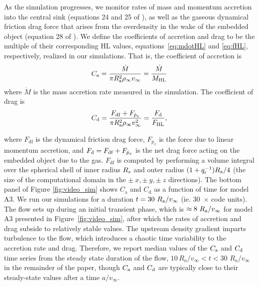 As the simulation progresses, we monitor rates of mass and momentum accretion into the central sink (equations 24 and 25 of \cite{MacLeod:2017}), as well as the gaseous dynamical friction drag force that arises from the overdensity in the wake of the embedded object (equation 28 of \cite{MacLeod:2017}). 
We define the coefficients of accretion and drag to be the multiple of their corresponding HL %
values, equations~\eqref{eq:mdotHL} and \eqref{eq:fHL}, respectively, realized in our simulations.  That is, the coefficient of accretion is
\begin{equation}\label{eq:C_a}
    C_{\mathrm a} = \frac{\dot M}{\pi R_{\mathrm{a}}^2 \rho_\infty v_\infty} = \frac{\dot M }{ M_{\rm{HL}}}
\end{equation}
where $\dot M$ is the mass accretion rate measured in the simulation. The coefficient of drag is 
\begin{equation}\label{eq:C_d}
    C_{\mathrm d} = \frac{F_{\mathrm{df}} + F_{\dot p_x} }{ \pi R_{\mathrm{a}}^2 \rho_\infty v_\infty^2} = \frac{F_{\rm d} }{ F_{\rm{HL}}},
\end{equation}

where $F_{\mathrm{df}}$ is the dynamical friction drag force, $F_{\dot p_x}$ is the force due to linear momentum accretion, and $F_{\rm d} = F_{\mathrm{df}} + F_{\dot p_x}$ is the net drag force acting on the embedded object due to the gas. $F_{\mathrm{df}}$ is computed by performing a volume integral over the spherical shell of inner radius $R_{\rm s}$ and outer radius $(1 + q_{\rm r}^{-1}) R_{\mathrm{a}}/4$ (the size of the computational domain in the $\pm~x, \pm~y, \pm~z$ directions).
The bottom panel of Figure \ref{fig:video_sim} shows $C_{\mathrm a}$ and $C_{\mathrm d}$ as a function of time for model A3. We run our simulations for a duration $t = 30~R_{\rm a}/v_\infty$ (ie. 30~$\times$ code units). The flow sets up during an initial transient phase, which is $\approx 8~R_{\rm a}/v_\infty$ for model A3 presented in Figure~\ref{fig:video_sim}, after which the rates of accretion and drag subside to relatively stable values. The upstream density gradient imparts turbulence to the flow, which introduces a chaotic time variability to the accretion rate and drag. Therefore, we report median values of the $C_{\rm a}$ and $C_{\rm d}$ time series from the steady state duration of the flow, $10 \, R_a / v_\infty < t < 30$ $R_a / v_\infty$ in the remainder of the paper, though $C_{\rm a}$ and $C_{\rm d}$ are typically close to their steady-state values after a time $a/v_\infty$. 

